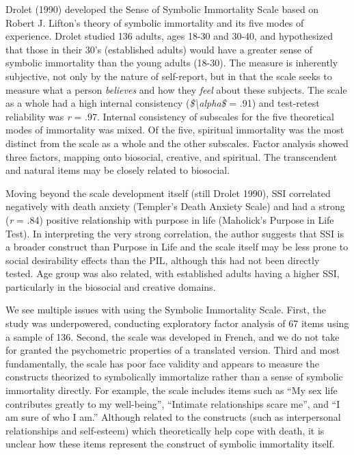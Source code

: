 \documentclass[
  man]{apa6}
\begin{document}
Drolet (1990) developed the Sense of Symbolic Immortality Scale based on
Robert J. Lifton's theory of symbolic immortality and its five modes of
experience. Drolet studied 136 adults, ages 18-30 and 30-40, and
hypothesized that those in their 30's (established adults) would have a
greater sense of symbolic immortality than the young adults (18-30). The
measure is inherently subjective, not only by the nature of self-report,
but in that the scale seeks to measure what a person \emph{believes} and how
they \emph{feel} about these subjects. The scale as a whole had a high
internal consistency (\emph{\$\textbackslash alpha\$} = .91) and test-retest reliability
was \emph{r} = .97. Internal consistency of subscales for the five
theoretical modes of immortality was mixed. Of the five, spiritual
immortality was the most distinct from the scale as a whole and the
other subscales. Factor analysis showed three factors, mapping onto
biosocial, creative, and spiritual. The transcendent and natural items
may be closely related to biosocial.

Moving beyond the scale development itself (still Drolet 1990), SSI
correlated negatively with death anxiety (Templer's Death Anxiety Scale)
and had a strong (\emph{r} = .84) positive relationship with purpose in life
(Maholick's Purpose in Life Test). In interpreting the very strong
correlation, the author suggests that SSI is a broader construct than
Purpose in Life and the scale itself may be less prone to social
desirability effects than the PIL, although this had not been directly
tested. Age group was also related, with established adults having a
higher SSI, particularly in the biosocial and creative domains.

We see multiple issues with using the Symbolic Immortality Scale. First,
the study was underpowered, conducting exploratory factor analysis of 67
items using a sample of 136. Second, the scale was developed in French,
and we do not take for granted the psychometric properties of a
translated version. Third and most fundamentally, the scale has poor
face validity and appears to measure the constructs theorized to
symbolically immortalize rather than a sense of symbolic immortality
directly. For example, the scale includes items such as ``My sex life
contributes greatly to my well-being'', ``Intimate relationships scare
me'', and ``I am sure of who I am.'' Although related to the constructs
(such as interpersonal relationships and self-esteem) which
theoretically help cope with death, it is unclear how these items
represent the construct of symbolic immortality itself.
\end{document}
